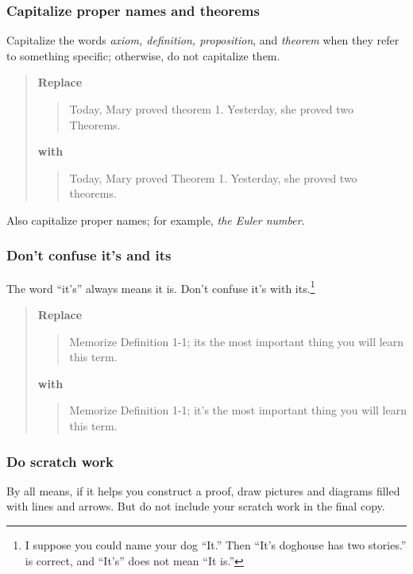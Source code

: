 \documentclass[12pt,fleqn]{article}
\newcounter{ex}\setcounter{ex}{0}
\newcounter{se}\setcounter{se}{0}
\begin{document}
 \subsubsection{  Capitalize proper names and theorems}

Capitalize the words {\em axiom, definition, proposition\/}, and {\em theorem\/}
when they refer to something specific; otherwise, do not
capitalize them.

\begin{quote}
\textbf{\textbf{Replace}}
\begin{quote}
Today, Mary proved theorem 1. Yesterday, she proved two Theorems.
\end{quote}
\textbf{with}
\begin{quote}
Today, Mary proved Theorem 1. Yesterday, she proved two theorems.
\end{quote}
\end{quote}
Also capitalize proper names; for example, \emph{the Euler
number}. 


 \subsubsection{  Don't confuse it's and its}

The word ``it's'' always means it is. Don't confuse it's with its.\footnote{I suppose you
could name your dog ``It.'' Then ``It's doghouse has two stories.'' is correct,
and ``It's'' does not mean ``It is.''} 

\begin{quote}
\textbf{\textbf{Replace}}
\begin{quote}
Memorize Definition 1-1; its the most important thing you will learn
this term.
\end{quote}
\textbf{with}
\begin{quote}
Memorize Definition 1-1; it's the most important thing you will learn
this term.
\end{quote}
\end{quote}




 \subsubsection{ Do scratch work}

By all means, if it helps you construct a proof, draw pictures and
diagrams filled with lines and arrows.  But do not include your scratch
work in the final copy.
\end{document}
